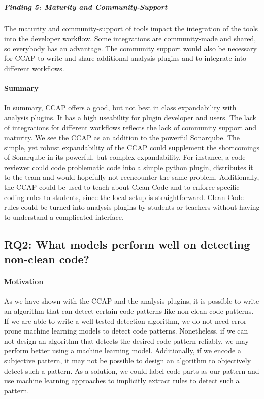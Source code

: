\subparagraph{Finding 5: Maturity and Community-Support}
The maturity and community-support of tools impact the integration of the tools into the developer workflow. Some integrations are community-made and shared, so everybody has an advantage. The community support would also be necessary for CCAP to write and share additional analysis plugins and to integrate into different workflows.

\paragraph{Summary}
In summary, CCAP offers a good, but not best in class expandability with analysis plugins. It has a high useability for plugin developer and users. The lack of integrations for different workflows reflects the lack of community support and maturity. 
We see the CCAP as an addition to the powerful Sonarqube. The simple, yet robust expandability of the CCAP could supplement the shortcomings of Sonarqube in its powerful, but complex expandability. For instance, a code reviewer could code problematic code into a simple python plugin, distributes it to the team and would hopefully not reencounter the same problem.
Additionally, the CCAP could be used to teach about Clean Code and to enforce specific coding rules to students, since the local setup is straightforward. Clean Code rules could be turned into analysis plugins by students or teachers without having to understand a complicated interface.

\subsection{RQ2: What models perform well on detecting non-clean code?}
\paragraph{Motivation}
As we have shown with the CCAP and the analysis plugins, it is possible to write an algorithm that can detect certain code patterns like non-clean code patterns. If we are able to write a well-tested detection algorithm, we do not need error-prone machine learning models to detect code patterns. Nonetheless, if we can not design an algorithm that detects the desired code pattern reliably, we may perform better using a machine learning model. Additionally, if we encode a subjective pattern, it may not be possible to design an algorithm to objectively detect such a pattern. As a solution, we could label code parts as our pattern and use machine learning approaches to implicitly extract rules to detect such a pattern.

